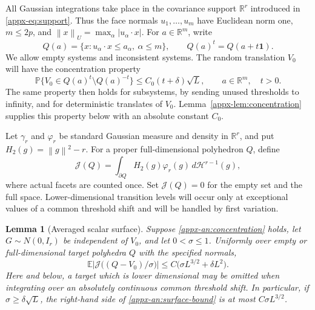 \documentclass[11pt,letterpaper]{article}
\newtheorem{lemma}{Lemma}
\theoremstyle{remark}
\newcommand{\E}{\mathbb E}
\newcommand{\Pp}{\mathbb P}
\newcommand{\R}{\mathbb R}
\newcommand{\norm}[1]{\left\lVert#1\right\rVert}
\newcommand{\dd}{\,d}
\newcommand{\Hh}{H_2}
\newcommand{\Ga}{\gamma_r}
\newcommand{\ph}{\varphi_r}
\newcommand{\surf}{\mathcal J}
\begin{document}
All Gaussian integrations take place in the covariance
support \(\R^r\) introduced in \eqref{appx-eq:support}.  Thus the face normals
\(u_1,\ldots,u_m\) have Euclidean norm one, \(m\le2p\), and
\(\norm{x}_U=\max_\alpha|u_\alpha\cdot x|\).
For \(a\in\R^m\), write
\[
 Q(a)=\{x:u_\alpha\cdot x\le a_\alpha,\ \alpha\le m\},
 \qquad Q(a)^t=Q(a+t\mathbf1).
\]
We allow empty systems and inconsistent systems.  The random
translation \(V_0\) will have the concentration property
\begin{equation}
 \Pp\{V_0\in Q(a)^t\setminus Q(a)^{-t}\}
 \le C_0(t+\delta)\sqrt L,
 \qquad a\in\R^m,\quad t>0.
 \label{appx-an:concentration}
\end{equation}
The same property then holds for subsystems, by sending unused
thresholds to infinity, and for deterministic translates of \(V_0\).
Lemma~\ref{appx-lem:concentration} supplies this property below with an
absolute constant \(C_0\).

Let \(\Ga\) and \(\ph\) be standard Gaussian measure and density
in \(\R^r\), and put
\(\Hh(g)=\norm{g}^2-r\).  For a proper full-dimensional polyhedron
\(Q\), define
\[
 \surf(Q)=\int_{\partial Q}\Hh(g)\ph(g)\dd\mathcal H^{r-1}(g),
\]
where actual facets are counted once.  Set \(\surf(Q)=0\) for the
empty set and the full space.  Lower-dimensional transition levels
will occur only at exceptional values of a common threshold shift and
will be handled by first variation.

\begin{lemma}[Averaged scalar surface]\label{appx-an:lem:surface}
Suppose \eqref{appx-an:concentration} holds, let \(G\sim N(0,I_r)\) be
independent of \(V_0\), and let \(0<\sigma\le1\).  Uniformly over
empty or full-dimensional target polyhedra \(Q\) with the specified normals,
\begin{equation}
 \E\left|\surf\bigl((Q-V_0)/\sigma\bigr)\right|
 \le C\bigl(\sigma L^{3/2}+\delta L^2\bigr).
 \label{appx-an:surface-bound}
\end{equation}
Here and below, a target which is lower dimensional may be omitted
when integrating over an absolutely continuous common threshold shift.
In particular, if \(\sigma\ge\delta\sqrt L\), the right-hand side of
\eqref{appx-an:surface-bound} is at most \(C\sigma L^{3/2}\).
\end{lemma}
\end{document}
